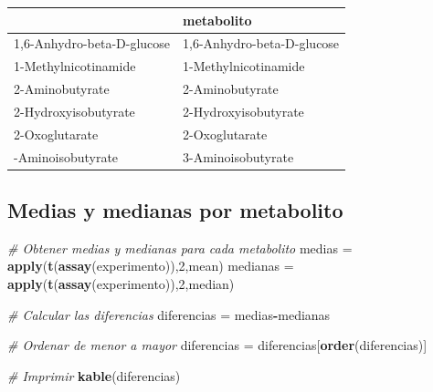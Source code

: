 \documentclass[
]{article}
\newenvironment{Shaded}{\begin{snugshade}}{\end{snugshade}}
\newcommand{\CommentTok}[1]{\textcolor[rgb]{0.56,0.35,0.01}{\textit{#1}}}
\newcommand{\DecValTok}[1]{\textcolor[rgb]{0.00,0.00,0.81}{#1}}
\newcommand{\FunctionTok}[1]{\textcolor[rgb]{0.13,0.29,0.53}{\textbf{#1}}}
\newcommand{\NormalTok}[1]{#1}
\newcommand{\OtherTok}[1]{\textcolor[rgb]{0.56,0.35,0.01}{#1}}
\newcommand{\SpecialCharTok}[1]{\textcolor[rgb]{0.81,0.36,0.00}{\textbf{#1}}}
\begin{document}
\begin{longtable}[t]{ll}
\toprule
 & metabolito\\
\midrule
1,6-Anhydro-beta-D-glucose & 1,6-Anhydro-beta-D-glucose\\
1-Methylnicotinamide & 1-Methylnicotinamide\\
2-Aminobutyrate & 2-Aminobutyrate\\
2-Hydroxyisobutyrate & 2-Hydroxyisobutyrate\\
2-Oxoglutarate & 2-Oxoglutarate\\
\addlinespace
3-Aminoisobutyrate & 3-Aminoisobutyrate\\
\bottomrule
\end{longtable}

\subsection{Medias y medianas por
metabolito}\label{medias-y-medianas-por-metabolito}

\begin{Shaded}
\begin{Highlighting}[]
\CommentTok{\# Obtener medias y medianas para cada metabolito}
\NormalTok{medias }\OtherTok{=} \FunctionTok{apply}\NormalTok{(}\FunctionTok{t}\NormalTok{(}\FunctionTok{assay}\NormalTok{(experimento)),}\DecValTok{2}\NormalTok{,mean)}
\NormalTok{medianas }\OtherTok{=} \FunctionTok{apply}\NormalTok{(}\FunctionTok{t}\NormalTok{(}\FunctionTok{assay}\NormalTok{(experimento)),}\DecValTok{2}\NormalTok{,median)}

\CommentTok{\# Calcular las diferencias}
\NormalTok{diferencias }\OtherTok{=}\NormalTok{ medias}\SpecialCharTok{{-}}\NormalTok{medianas}

\CommentTok{\# Ordenar de menor a mayor}
\NormalTok{diferencias }\OtherTok{=}\NormalTok{ diferencias[}\FunctionTok{order}\NormalTok{(diferencias)]}

\CommentTok{\# Imprimir}
\FunctionTok{kable}\NormalTok{(diferencias)}
\end{Highlighting}
\end{Shaded}
\end{document}
